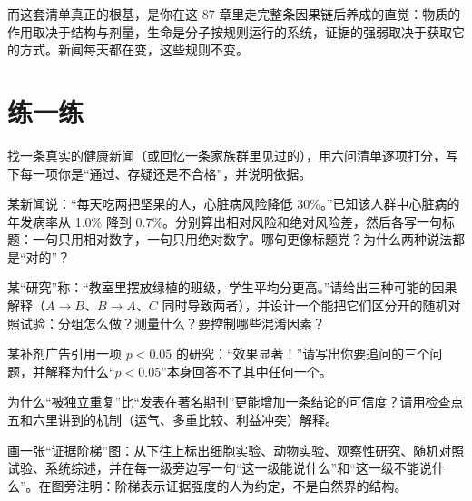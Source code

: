 而这套清单真正的根基，是你在这 87 章里走完整条因果链后养成的直觉：物质的作用取决于结构与剂量，生命是分子按规则运行的系统，证据的强弱取决于获取它的方式。新闻每天都在变，这些规则不变。

\section*{练一练}

\begin{sikaoti}
\item 找一条真实的健康新闻（或回忆一条家族群里见过的），用六问清单逐项打分，写下每一项你是“通过、存疑还是不合格”，并说明依据。
\item 某新闻说：“每天吃两把坚果的人，心脏病风险降低 30\%。”已知该人群中心脏病的年发病率从 1.0\% 降到 0.7\%。分别算出相对风险和绝对风险差，然后各写一句标题：一句只用相对数字，一句只用绝对数字。哪句更像标题党？为什么两种说法都是“对的”？
\item 某“研究”称：“教室里摆放绿植的班级，学生平均分更高。”请给出三种可能的因果解释（$A\rightarrow B$、$B\rightarrow A$、$C$ 同时导致两者），并设计一个能把它们区分开的随机对照试验：分组怎么做？测量什么？要控制哪些混淆因素？
\item 某补剂广告引用一项 $p<0.05$ 的研究：“效果显著！”请写出你要追问的三个问题，并解释为什么“$p<0.05$”本身回答不了其中任何一个。
\item 为什么“被独立重复”比“发表在著名期刊”更能增加一条结论的可信度？请用检查点五和六里讲到的机制（运气、多重比较、利益冲突）解释。
\item 画一张“证据阶梯”图：从下往上标出细胞实验、动物实验、观察性研究、随机对照试验、系统综述，并在每一级旁边写一句“这一级能说什么”和“这一级不能说什么”。在图旁注明：阶梯表示证据强度的人为约定，不是自然界的结构。
\end{sikaoti}
